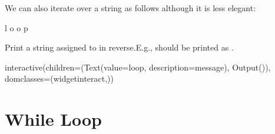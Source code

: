 \documentclass[letterpaper,10pt,english]{sphinxmanual}
\begin{document}
We can also iterate over a string as follows although it is less elegant:

\begin{sphinxVerbatim}[commandchars=\\\{\}]
    \PYG{p}{[}\PYG{p}{]}
\end{sphinxVerbatim}

\begin{sphinxVerbatim}[commandchars=\\\{\}]
l
o
o
p
\end{sphinxVerbatim}

 Print a string assigned to  in reverse.E.g.,  should be printed as .

\begin{sphinxVerbatim}[commandchars=\\\{\}]
 
       
        \PYG{p}{[}  \PYG{p}{]} 
\end{sphinxVerbatim}

\begin{sphinxVerbatim}[commandchars=\\\{\}]
interactive(children=(Text(value=\PYGZsq{}loop\PYGZsq{}, description=\PYGZsq{}message\PYGZsq{}), Output()), \PYGZus{}dom\PYGZus{}classes=(\PYGZsq{}widget\PYGZhy{}interact\PYGZsq{},))
\end{sphinxVerbatim}


\section{While Loop}
\label{\detokenize{Lecture3/Iteration:while-loop}}
\end{document}
